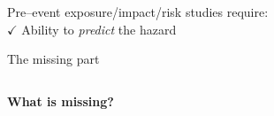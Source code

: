 \documentclass[10pt,aspectratio=169]{beamer}
\begin{document}
\begin{frame}[standout]
  Pre--event exposure/impact/risk studies require:\\ \vspace*{1em}
  \alert{$\checkmark$ \textnormal{Ability to \textit{predict} the hazard}}
\end{frame}



\begin{frame}[t]{The missing part}

  \begin{columns}[T]
    \begin{column}{0.5\textwidth}	
      \textbf{What is missing?}
      \vspace*{1em}

    \end{column}


\end{columns}
\end{frame}
\end{document}
